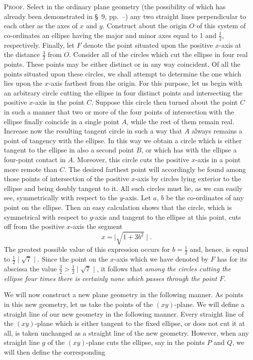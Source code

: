 \documentclass[11pt,oneside]{book}
\begin{document}
{\scshape Proof.} Select in the ordinary plane geometry (the
possibility of which has already been demonstrated in
\S~9, pp.~\pageref{folio27}--\pageref{folio30}) any two straight lines perpendicular
to each other as the axes of $x$ and $y$. Construct about
the origin $O$ of this system of co-ordinates an ellipse
having the major and minor axes equal to 1 and $\frac{1}{2}$, respectively.
Finally, let $F$ denote the point situated
upon the positive $x$-axis at the distance $\frac{3}{2}$ from $O$.
Consider all of the circles which cut the ellipse in
four real points. These points may be either distinct
or in any way coincident. Of all the points situated
upon these circles, we shall attempt to determine the
one which lies upon the $x$-axis farthest from the origin.
For this purpose, let us begin with an arbitrary
circle cutting the ellipse in four distinct points and
intersecting the positive $x$-axis in the point $C$. Suppose
this circle then turned about the point $C$ in
such a manner that two or more of the four points of
intersection with the ellipse finally coincide in a single
point $A$, while the rest of them remain real. Increase
now the resulting tangent circle in such a way that $A$
always remains a point of tangency with the ellipse.
In this way we obtain a circle which is either tangent
to the ellipse in also a second point $B$, or which has
with the ellipse a four-point contact in $A$. Moreover,
this circle cuts the positive $x$-axis in a point more remote
than $C$. The desired farthest point will accordingly
be found among those points of intersection of
the positive $x$-axis by circles lying exterior to the
ellipse and being doubly tangent to it. All such circles
must lie, as we can easily see, symmetrically with
respect to the $y$-axis. Let $a$, $b$ be the co-ordinates of
any point on the ellipse. Then an easy calculation
shows that the circle, which is symmetrical with respect
to $y$-axis and tangent to the ellipse at this point,
cuts off from the positive $x$-axis the segment
\[
x = \mid \sqrt{1 + 3b^2} \mid.
\]
The greatest possible value of this expression occurs
for $b = \frac{1}{2}$ and, hence, is equal to $\frac{1}{2}\mid\sqrt{7}\mid$. Since the
point on the $x$-axis which we have denoted by $F$ has
for its abscissa the value $\frac{3}{2} > \frac{1}{2} \mid\sqrt{7}\mid$, it follows that
\emph{among the circles cutting the ellipse four times there is
certainly none which passes through the point $F$.}

We will now construct a new plane geometry in
the following manner. As points in this new geometry,
let us take the points of the $(xy)$-plane. We
will define a straight line of our new geometry in the
following manner. Every straight line of the $(xy)$-plane
which is either tangent to the fixed ellipse, or
does not cut it at all, is taken unchanged as a straight
line of the new geometry. However, when any straight
line $g$ of the $(xy)$-plane cuts the ellipse, say in the
points $P$ and $Q$, we will then define the corresponding
\end{document}
